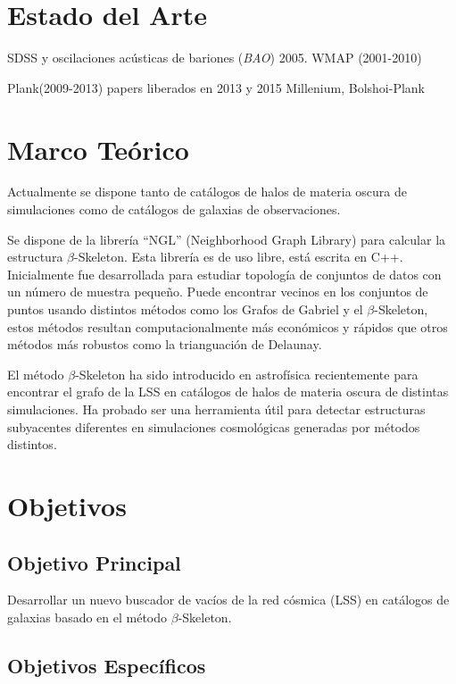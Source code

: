 \documentclass[preprint]{aastex62}
\begin{document}
  \section{Estado del Arte}

  SDSS y oscilaciones acústicas de bariones (\textit{BAO}) 2005.
  WMAP (2001-2010)

  Plank(2009-2013) papers liberados en 2013 y 2015
  Millenium, Bolshoi-Plank

  \section{Marco Teórico}

  Actualmente se dispone tanto de catálogos de halos de materia oscura de simulaciones como de catálogos de galaxias de observaciones.

  Se dispone de la librería ``NGL''\citep{ngl} (Neighborhood Graph Library)
  para calcular la estructura $\beta$-Skeleton. Esta librería es de uso libre, está escrita en C++.
  Inicialmente fue desarrollada para estudiar topología de conjuntos de datos con un número de muestra
  pequeño. Puede encontrar vecinos en los conjuntos de puntos usando distintos métodos como los
  Grafos de Gabriel y el $\beta$-Skeleton, estos métodos resultan computacionalmente más económicos
  y rápidos que otros métodos más robustos como la trianguación de Delaunay.

  El método $\beta$-Skeleton ha sido introducido en astrofísica recientemente \citep{Fang2018} para
  encontrar el grafo de la LSS en catálogos de halos de materia oscura de distintas simulaciones.
  Ha probado ser una herramienta útil para detectar estructuras subyacentes diferentes en
  simulaciones cosmológicas generadas por métodos distintos.
  

  \section{Objetivos}

  \subsection{Objetivo Principal}
  Desarrollar un nuevo buscador de vacíos de la red cósmica (LSS) en catálogos de galaxias
  basado en el método $\beta$-Skeleton.
  
  \subsection{Objetivos Específicos}
\end{document}
